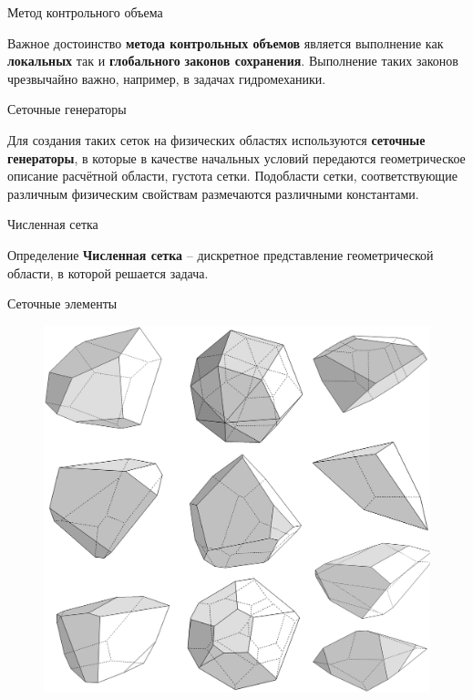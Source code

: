\documentclass[10pt,xcolor=pst,aspectratio=169]{beamer}
\begin{document}
\begin{frame}{Метод контрольного объема}

	\transdissolve[duration=0.1]
	\justifying
	\large

	Важное достоинство \textbf{метода контрольных объемов} является выполнение как \textbf{локальных} так и \textbf{глобального} \textbf{законов сохранения}. Выполнение таких законов чрезвычайно важно, например, в задачах гидромеханики.

\end{frame}

\begin{frame}{Сеточные генераторы}

	\transdissolve[duration=0.1]
	\justifying
	\large

	Для создания таких сеток на физических областях используются \textbf{сеточные генераторы}, в которые в качестве начальных условий передаются геометрическое описание расчётной области, густота сетки. Подобласти сетки, соответствующие различным физическим свойствам размечаются различными константами.

\end{frame}

\begin{frame}{Численная сетка}

	\transdissolve[duration=0.1]
	\justifying
	\large

	\begin{block}{Определение}
		\justifying
		\textbf{Численная сетка} -- дискретное представление геометрической области, в которой решается задача.
	\end{block}

\end{frame}

\begin{frame}{Сеточные элементы}

	\transdissolve[duration=0.1]
	\justifying
	\large

	\begin{figure}
		\includegraphics[width=0.5\linewidth]{FV_example.eps}
	\end{figure}

\end{frame}
\end{document}
